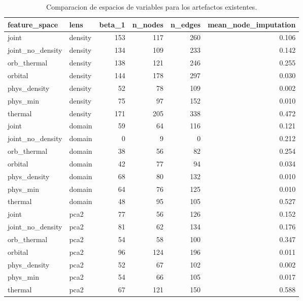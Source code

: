 \begin{table}[H]
\centering
\scriptsize
\caption{Comparacion de espacios de variables para los artefactos existentes.}
\label{tab:space_comparison}
\begin{adjustbox}{max width=\linewidth}
\begin{tabular}{llrrrr}
\toprule
feature\_space & lens & beta\_1 & n\_nodes & n\_edges & mean\_node\_imputation \\
\midrule
joint & density & 153 & 117 & 260 & 0.106 \\
joint\_no\_density & density & 134 & 109 & 233 & 0.142 \\
orb\_thermal & density & 138 & 121 & 246 & 0.255 \\
orbital & density & 144 & 178 & 297 & 0.030 \\
phys\_density & density & 52 & 78 & 109 & 0.002 \\
phys\_min & density & 75 & 97 & 152 & 0.010 \\
thermal & density & 171 & 205 & 338 & 0.472 \\
joint & domain & 59 & 64 & 116 & 0.121 \\
joint\_no\_density & domain & 0 & 9 & 0 & 0.212 \\
orb\_thermal & domain & 38 & 56 & 82 & 0.254 \\
orbital & domain & 42 & 77 & 94 & 0.034 \\
phys\_density & domain & 68 & 80 & 132 & 0.010 \\
phys\_min & domain & 64 & 76 & 125 & 0.010 \\
thermal & domain & 48 & 95 & 105 & 0.527 \\
joint & pca2 & 77 & 56 & 126 & 0.152 \\
joint\_no\_density & pca2 & 81 & 62 & 134 & 0.176 \\
orb\_thermal & pca2 & 54 & 58 & 100 & 0.347 \\
orbital & pca2 & 96 & 124 & 196 & 0.011 \\
phys\_density & pca2 & 52 & 67 & 102 & 0.002 \\
phys\_min & pca2 & 54 & 66 & 105 & 0.017 \\
thermal & pca2 & 67 & 121 & 150 & 0.588 \\
\bottomrule
\end{tabular}
\end{adjustbox}

\end{table}
